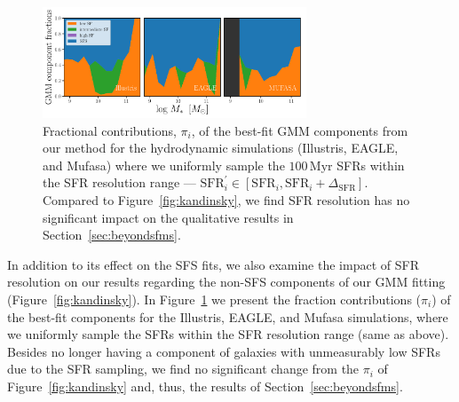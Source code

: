 \documentclass[tighten, preprint]{aastex62}
\begin{document}
\begin{figure}
\begin{center}
\includegraphics[width=0.7\textwidth]{GMMcomp_comp_res_impact.pdf}
\caption{Fractional contributions, $\pi_i$, of the best-fit GMM components 
from our method for the hydrodynamic simulations (Illustris, EAGLE, and 
{\sc Mufasa}) where we uniformly sample the $100\,\mathrm{Myr}$ SFRs within
the SFR resolution range --- $\mathrm{SFR}_i^{\prime} \in [\mathrm{SFR}_i, \mathrm{SFR}_i + 
\Delta_\mathrm{SFR}]$. Compared to Figure~\ref{fig:kandinsky}, we find SFR 
resolution has no significant impact on the qualitative results in Section~\ref{sec:beyondsfms}.} 
\label{fig:mlim_fcomp}
\end{center}
\end{figure}

In addition to its effect on the SFS fits, we also examine the impact of 
SFR resolution on our results regarding the non-SFS components of our GMM 
fitting (Figure~\ref{fig:kandinsky}). In 
Figure~\ref{fig:mlim_fcomp} we present the fraction contributions ($\pi_i$) 
of the best-fit components for the Illustris, EAGLE, and {\sc Mufasa} 
simulations, where we uniformly sample the SFRs within the SFR resolution 
range (same as above). Besides no longer having a component of galaxies 
with unmeasurably low SFRs due to the SFR sampling, we find no significant 
change from the $\pi_i$ of Figure~\ref{fig:kandinsky} and,  thus, the results of Section~\ref{sec:beyondsfms}. 



\end{document}
